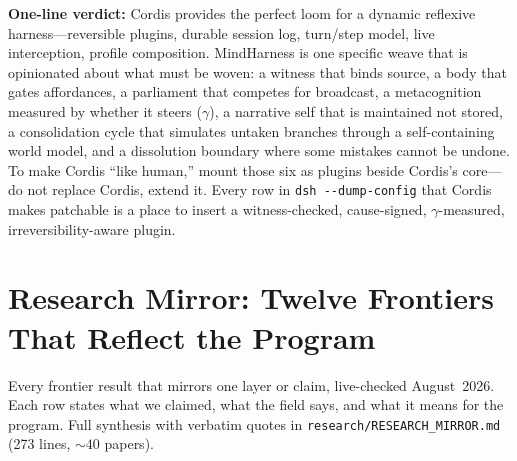 \documentclass[11pt]{article}
\begin{document}
\noindent\textbf{One-line verdict:} Cordis provides the perfect loom for a dynamic
reflexive harness---reversible plugins, durable session log, turn/step model,
live interception, profile composition. MindHarness is one specific weave that
is opinionated about what must be woven: a witness that binds source, a body
that gates affordances, a parliament that competes for broadcast, a
metacognition measured by whether it steers ($\gamma$), a narrative self that is
maintained not stored, a consolidation cycle that simulates untaken branches
through a self-containing world model, and a dissolution boundary where some
mistakes cannot be undone. To make Cordis ``like human,'' mount those six as
plugins beside Cordis's core---do not replace Cordis, extend it. Every row in
\texttt{dsh -\allowbreak{}-\allowbreak{}dump-\allowbreak{}config} that Cordis makes patchable is a place to insert a
witness-checked, cause-signed, $\gamma$-measured, irreversibility-aware plugin.

\section{Research Mirror: Twelve Frontiers That Reflect the Program}
\label{app:mirror}

Every frontier result that mirrors one layer or claim, live-checked
August~2026. Each row states what we claimed, what the field says, and
what it means for the program. Full synthesis with verbatim quotes in
\texttt{research/RESEARCH\_MIRROR.md} (273 lines, ${\sim}40$ papers).
\end{document}
